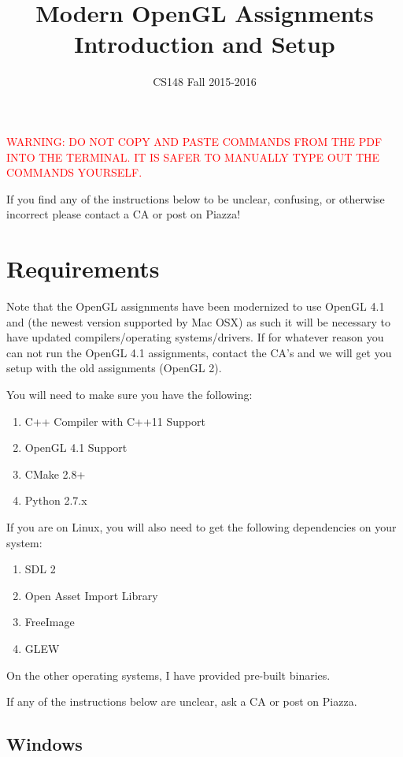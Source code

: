 \documentclass{article}
\begin{document}
\title{Modern OpenGL Assignments Introduction and Setup}
\author{CS148 Fall 2015-2016}
\date{}
\maketitle

\textcolor{red}{WARNING: DO NOT COPY AND PASTE COMMANDS FROM THE PDF INTO THE TERMINAL. IT IS SAFER TO MANUALLY TYPE OUT THE COMMANDS YOURSELF.}

If you find any of the instructions below to be unclear, confusing, or otherwise incorrect please contact a CA or post on Piazza!

\section*{Requirements}

Note that the OpenGL assignments have been modernized to use OpenGL 4.1 and (the newest version supported by Mac OSX) as such it will be necessary to have updated compilers/operating systems/drivers. If for whatever reason you can not run the OpenGL 4.1 assignments, contact the CA's and we will get you setup with the old assignments (OpenGL 2).

You will need to make sure you have the following:
\begin{enumerate}
    \item C++ Compiler with C++11 Support
    \item OpenGL 4.1 Support
    \item CMake 2.8+
    \item Python 2.7.x
\end{enumerate}

If you are on Linux, you will also need to get the following dependencies on your system:
\begin{enumerate}
    \item SDL 2
    \item Open Asset Import Library
    \item FreeImage
    \item GLEW
\end{enumerate}

On the other operating systems, I have provided pre-built binaries.

If any of the instructions below are unclear, ask a CA or post on Piazza.

\subsection*{Windows}
\end{document}

